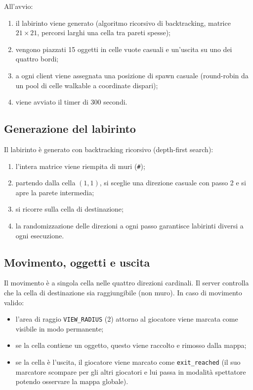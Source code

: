 \documentclass[a4paper,11pt]{article}
\begin{document}
All'avvio:
\begin{enumerate}[topsep=0.3em]
    \item il labirinto viene generato (algoritmo ricorsivo di backtracking,
          matrice $21\times21$, percorsi larghi una cella tra pareti spesse);
    \item vengono piazzati 15 oggetti in celle vuote casuali e un'uscita
          su uno dei quattro bordi;
    \item a ogni client viene assegnata una posizione di spawn casuale
          (round-robin da un pool di celle walkable a coordinate dispari);
    \item viene avviato il timer di 300 secondi.
\end{enumerate}

\subsection{Generazione del labirinto}

Il labirinto è generato con backtracking ricorsivo (depth-first search):
\begin{enumerate}[topsep=0.3em]
    \item l'intera matrice viene riempita di muri (\texttt{\#});
    \item partendo dalla cella $(1,1)$, si sceglie una direzione casuale
          con passo 2 e si apre la parete intermedia;
    \item si ricorre sulla cella di destinazione;
    \item la randomizzazione delle direzioni a ogni passo garantisce
          labirinti diversi a ogni esecuzione.
\end{enumerate}

\subsection{Movimento, oggetti e uscita}

Il movimento è a singola cella nelle quattro direzioni cardinali. Il
server controlla che la cella di destinazione sia raggiungibile (non muro).
In caso di movimento valido:
\begin{itemize}[topsep=0.3em]
    \item l'area di raggio \texttt{VIEW\_RADIUS} (2) attorno al giocatore
          viene marcata come visibile in modo permanente;
    \item se la cella contiene un oggetto, questo viene raccolto e rimosso
          dalla mappa;
    \item se la cella è l'uscita, il giocatore viene marcato come
          \texttt{exit\_reached} (il suo marcatore scompare per gli altri
          giocatori e lui passa in modalità spettatore potendo osservare
          la mappa globale).
\end{itemize}
\end{document}
